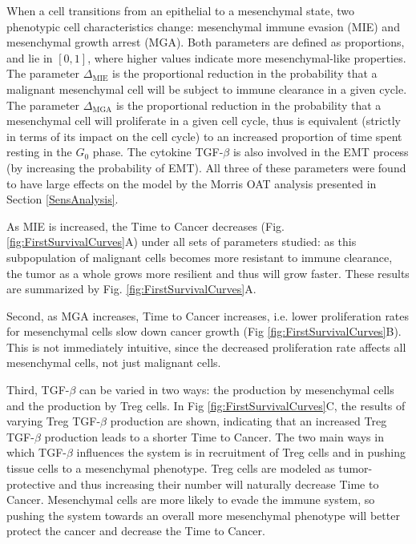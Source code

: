 \documentclass[11pt]{article}
\begin{document}
When a cell transitions from an epithelial to a mesenchymal state, two phenotypic cell characteristics change: mesenchymal immune evasion (MIE) and mesenchymal growth arrest (MGA).
Both parameters are defined as proportions, and lie in $[0,1]$, where higher values indicate more mesenchymal-like properties.
The parameter $\Delta_\text{MIE}$ is the proportional reduction in the probability that a malignant mesenchymal cell will be subject to immune clearance in a given cycle.
The parameter $\Delta_\text{MGA}$ is the proportional reduction in the probability that a mesenchymal cell will proliferate in a given cell cycle, thus is equivalent (strictly in terms of its impact on the cell cycle) to an increased proportion of time spent resting in the $G_0$ phase.
The cytokine TGF-$\beta$ is also involved in the EMT process (by increasing the probability of EMT). All three of these parameters were found to have large effects on the model by the Morris OAT analysis presented in Section \ref{SensAnalysis}.
\par 
As MIE is increased, the Time to Cancer decreases (Fig. \ref{fig:FirstSurvivalCurves}A) under all sets of parameters studied: as this subpopulation of malignant cells becomes more resistant to immune clearance, the tumor as a whole grows more resilient and thus will grow faster.
These results are summarized by Fig. \ref{fig:FirstSurvivalCurves}A.
\par
Second, as MGA increases, Time to Cancer increases, i.e. lower proliferation rates for mesenchymal cells slow down cancer growth (Fig \ref{fig:FirstSurvivalCurves}B).
This is not immediately intuitive, since the decreased proliferation rate affects all mesenchymal cells, not just malignant cells.
\par
Third, TGF-$\beta$ can be varied in two ways: the production by mesenchymal cells and the production by Treg cells.
In Fig \ref{fig:FirstSurvivalCurves}C, the results of varying Treg TGF-$\beta$ production are shown, indicating that an increased Treg TGF-$\beta$ production leads to a shorter Time to Cancer.
The two main ways in which TGF-$\beta$ influences the system is in recruitment of Treg cells and in pushing tissue cells to a mesenchymal phenotype.
Treg cells are modeled as tumor-protective and thus increasing their number will naturally decrease Time to Cancer.
Mesenchymal cells are more likely to evade the immune system, so pushing the system towards an overall more mesenchymal phenotype will better protect the cancer and decrease the Time to Cancer.
\end{document}
